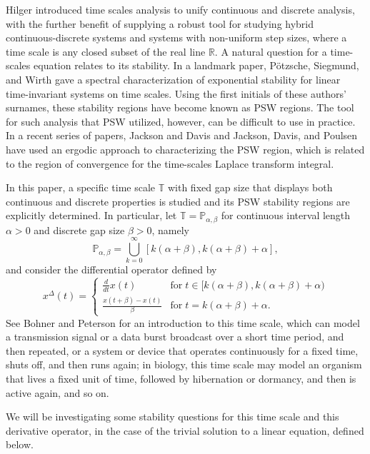 \documentclass[12pt,reqno]{amsart}
\theoremstyle{plain}
\theoremstyle{definition}
\newcommand{\R}{\ensuremath{\mathbb{R}}}
\newcommand{\T}{\ensuremath{\mathbb{T}}}
\newcommand{\p}{\ensuremath{\mathbb{P}}}
\numberwithin{equation}{section}
\numberwithin{theorem}{section}
\begin{document}
Hilger \cite{hilger} introduced time scales analysis to unify continuous and discrete analysis, with the further benefit of supplying a robust tool for studying hybrid continuous-discrete systems and systems with non-uniform step sizes, where a time scale is any closed subset of the real line $\R$. A natural question for a time-scales equation relates to its stability. 
In a landmark paper, P\"{o}tzsche, Siegmund, and Wirth \cite{psw} gave a spectral characterization of exponential stability for linear time-invariant
systems on time scales. Using the first initials of these authors' surnames, these stability regions have become known as PSW regions. The tool for such analysis that PSW utilized, however, can be difficult to use in practice. In a recent series of papers, Jackson and Davis \cite{jd1,jd2} and Jackson, Davis, and Poulsen \cite{jdp} have used an ergodic approach to characterizing the PSW region, which is related to the region of convergence for the time-scales Laplace transform integral. 


In this paper, a specific time scale $\T$ with fixed gap size that displays both continuous and discrete properties is studied and its PSW stability regions are explicitly determined. In particular, let $\T=\p_{\alpha,\beta}$ for continuous interval length $\alpha>0$ and discrete gap size $\beta>0$, namely
\[ \p_{\alpha,\beta} = \bigcup_{k=0}^{\infty}[k(\alpha+\beta),k(\alpha+\beta)+\alpha], \]
and consider the differential operator defined by
\[ x^{\Delta}(t) = \begin{cases} \frac{d}{dt}x(t) &\text{for}\; t\in[k(\alpha+\beta),k(\alpha+\beta)+\alpha) \\ \frac{x(t+\beta)-x(t)}{\beta} &\text{for}\; t=k(\alpha+\beta)+\alpha. \end{cases} \]
See Bohner and Peterson \cite[Examples 1.38--1.40]{bp} for an introduction to this time scale, which can model a transmission signal or a data burst broadcast over a short time period, and then repeated, or a system or device that operates continuously for a fixed time, shuts off, and then runs again; in biology, this time scale may model an organism that lives a fixed unit of time, followed by hibernation or dormancy, and then is active again, and so on.  

We will be investigating some stability questions for this time scale and this derivative operator, in the case of the trivial solution to a linear equation, defined below. 
\end{document}
